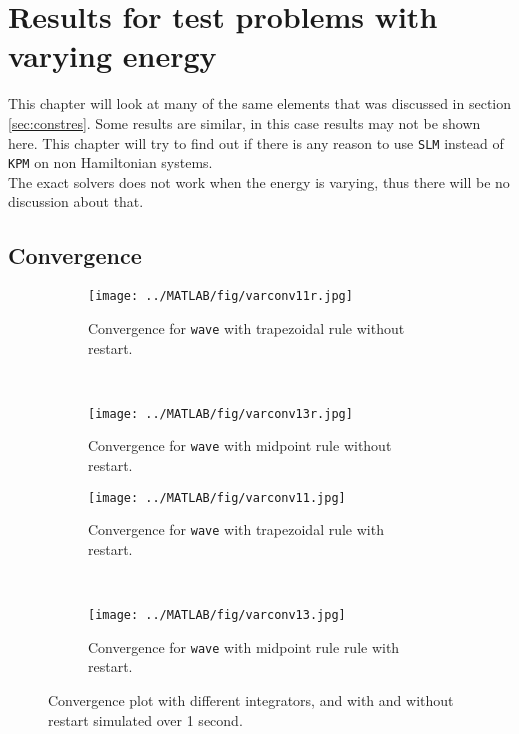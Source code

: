 \chapter{Results for test problems with varying energy}%
\label{sec:varyener} %
This chapter will look at many of the same elements that was discussed in section \ref{sec:constres}. Some results are similar, in this case results may not be shown here. This chapter will try to find out if there is any reason to use \texttt{SLM} instead of \texttt{KPM} on non Hamiltonian systems. \\
The exact solvers does not work when the energy is varying, thus there will be no discussion about that.
\section{Convergence} %
\begin{figure}[H]
        \centering
        
		
		\begin{subfigure}[b]{0.45\textwidth}
                \texttt{[image: ../MATLAB/fig/varconv11r.jpg]}
                \caption{ Convergence for \texttt{wave} with trapezoidal rule without restart. }
                \label{fig:varconv11r}
        \end{subfigure}%
        ~
        \begin{subfigure}[b]{0.45\textwidth}
                \texttt{[image: ../MATLAB/fig/varconv13r.jpg]}
                \caption{ Convergence for \texttt{wave} with midpoint rule without restart. }
                \label{fig:varconv13r}
        \end{subfigure}
        \begin{subfigure}[b]{0.45\textwidth}
                \texttt{[image: ../MATLAB/fig/varconv11.jpg]}
                \caption{ Convergence for \texttt{wave} with trapezoidal rule with restart. }
                \label{fig:varconv11}
        \end{subfigure}%
        ~
        \begin{subfigure}[b]{0.45\textwidth}
                \texttt{[image: ../MATLAB/fig/varconv13.jpg]}
                \caption{ Convergence for \texttt{wave} with midpoint rule rule with restart. }
                \label{fig:varconv13}
        \end{subfigure}

        \caption{ Convergence plot with different integrators, and with and without restart simulated over 1 second. }
        \label{fig:varconv}
\end{figure}


